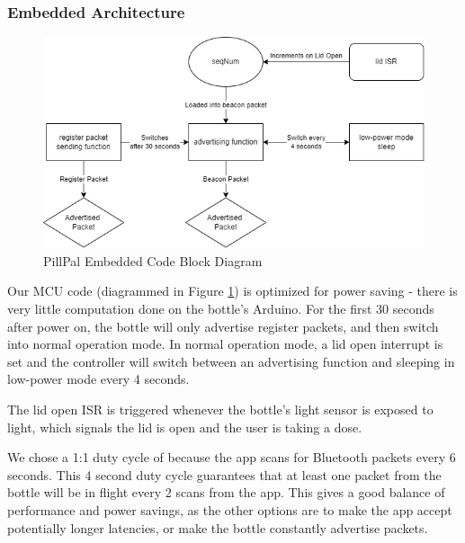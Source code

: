 \documentclass[sigconf]{acmart}
\begin{document}
\subsubsection{Embedded Architecture}
\label{sec:embeded_arch}
\begin{figure}[h]
  \centering
  \includegraphics[width=\linewidth]{images/embedded_block.png}
  \caption{PillPal Embedded Code Block Diagram}
  \label{fig:em_block}
\end{figure}

Our MCU code (diagrammed in Figure \ref{fig:em_block}) is  optimized for power saving - there is very little computation done on the bottle's Arduino. For the first 30 seconds after power on, the bottle will only advertise register packets, and then switch into normal operation mode. In normal operation mode, a lid open interrupt is set and the controller will switch between an advertising function and sleeping in low-power mode every 4 seconds.

The lid open ISR is triggered whenever the bottle's light sensor is exposed to light, which signals the lid is open and the user is taking a dose.

We chose a 1:1 duty cycle of because the app scans for Bluetooth packets every 6 seconds. This 4 second duty cycle guarantees that at least one packet from the bottle will be in flight every 2 scans from the app. This gives a good balance of performance and power savings, as the other options are to make the app accept potentially longer latencies, or make the bottle constantly advertise packets.
\end{document}
